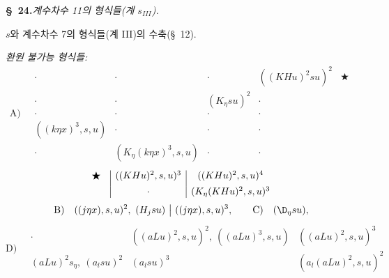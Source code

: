 
\begin{center}\textbf{\S\ 24.}\quad\emph{계수차수 11의 형식들(계 $s_{III}$).}\end{center}
$s$와 계수차수 7의 형식들(계 III)의 수축(\S\ 12).

\noindent\emph{환원 불가능 형식들:}
\[
\text{A)}\quad
\begin{array}{c|c|c|c|c}
\cdot&\cdot&\cdot&((KHu)^2su)^2&\bigstar\\[0.35em]
\cdot&\cdot&(K_\eta su)^2&\cdot&\\[0.35em]
\cdot&\cdot&\cdot&\cdot&\\[0.35em]
((k\eta x)^3,s,u)&\cdot&\cdot&\cdot&\\[0.35em]
\cdot&(K_\eta(k\eta x)^3,s,u)&\cdot&\cdot&
\end{array}
\]
\[
\begin{array}{c@{\quad}|c|c}
\bigstar&((KHu)^2,s,u)^3&((KHu)^2,s,u)^4\\[0.45em]
&\cdot&(K_\eta(KHu)^2,s,u)^3
\end{array}
\]
\[
\text{B)}\quad ((j\eta x),s,u)^2,\ (H_jsu)\ \big|\ ((j\eta x),s,u)^3,
\qquad \text{C)}\quad (\D_\eta su),
\]
\[
\text{D)}\quad
\begin{array}{c|c|c}
\cdot&((aLu)^2,s,u)^2,\ ((aLu)^3,s,u)&((aLu)^2,s,u)^3\\[0.5em]
(aLu)^2s_\eta,\ (a_lsu)^2&(a_lsu)^3&(a_l(aLu)^2,s,u)^2
\end{array}
\]
